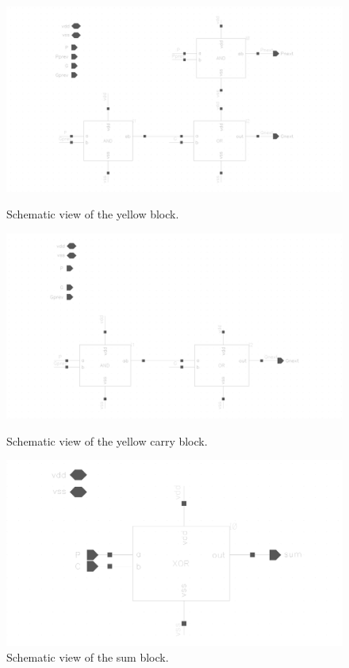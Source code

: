 \begin{figure}[H]
  \centering
  \captionsetup{justification=centering}
  {\includegraphics[width=1.3\textwidth]{../figures/yellow}}
  \caption{Schematic view of the yellow block.} \label{fig:yellow}
\end{figure}

\begin{figure}[H]
  \centering
  \captionsetup{justification=centering}
  {\includegraphics[width=1.2\textwidth]{../figures/yellow_carry}}
  \caption{Schematic view of the yellow carry block.} \label{fig:yellow_c}
\end{figure}

\begin{figure}[H]
  \centering
  \captionsetup{justification=centering}
  \includegraphics[clip,width=1.0\textwidth]{../figures/sum}
  \caption{Schematic view of the sum block.} \label{fig:sum}
\end{figure}

